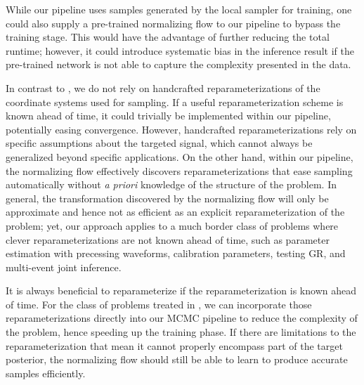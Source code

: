 \documentclass[twocolumn]{aastex631}
\begin{document}
While our pipeline uses samples generated by the local sampler for training,
one could also supply a pre-trained normalizing flow to our pipeline to bypass
the training stage. This would have the advantage of further reducing the total
runtime; however, it could introduce systematic bias in the inference result if
the pre-trained network is not able to capture the complexity presented in the
data.

In contrast to \cite{Islam:2022afg,Roulet:2022kot}, we do not rely on
handcrafted reparameterizations of the coordinate systems used for sampling. If
a useful reparameterization scheme is known ahead of time, it could trivially
be implemented within our pipeline, potentially easing convergence. However,
handcrafted reparameterizations rely on specific assumptions about the targeted
signal, which cannot always be generalized beyond specific applications. On the
other hand, within our pipeline, the normalizing flow effectively discovers
reparameterizations that ease sampling automatically without \emph{a priori}
knowledge of the structure of the problem. In general, the transformation
discovered by the normalizing flow will only be approximate and hence not as
efficient as an explicit reparameterization of the problem; yet, our approach
applies to a much border class of problems where clever reparameterizations are
not known ahead of time, such as parameter estimation with precessing
waveforms, calibration parameters, testing GR, and multi-event joint inference.

It is always beneficial to reparameterize if the reparameterization is known
ahead of time. For the class of problems treated in
\cite{Islam:2022afg,Roulet:2022kot}, we can incorporate those
reparameterizations directly into our MCMC pipeline to reduce the complexity of the
problem, hence speeding up the training phase. If there are limitations to the
reparameterization that mean it cannot properly encompass part of the target
posterior, the normalizing flow should still be able to learn to produce
accurate samples efficiently.
\end{document}
